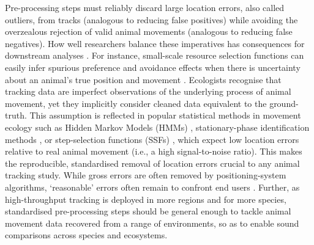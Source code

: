 \documentclass[10pt,paper=a4,headings=standardclasses
]{scrartcl}
\begin{document}
Pre-processing steps must reliably discard large location errors, also called outliers, from tracks (analogous to reducing false positives) while avoiding the overzealous rejection of valid animal movements (analogous to reducing false negatives).
How well researchers balance these imperatives has consequences for downstream analyses \citep{stine2001}.
For instance, small-scale resource selection functions can easily infer spurious preference and avoidance effects when there is uncertainty about an animal's true position and movement \citep{visscher2006}.
Ecologists recognise that tracking data are imperfect observations of the underlying process of animal movement, yet they implicitly consider cleaned data equivalent to the ground-truth.
This assumption is reflected in popular statistical methods in movement ecology such as Hidden Markov Models (HMMs) \citep{langrock2012}, stationary-phase identification methods \citep{patin2020a}, or step-selection functions (SSFs) \citep{barnett2008, signer2017, avgar2016}, which expect low location errors relative to real animal movement (i.e., a high signal-to-noise ratio).
This makes the reproducible, standardised removal of location errors crucial to any animal tracking study.
While gross errors are often removed by positioning-system algorithms, ‘reasonable’ errors often remain to confront end users \citep{fischler1981, weiser2016, ranacher2016}.
Further, as high-throughput tracking is deployed in more regions and for more species, standardised pre-processing steps should be general enough to tackle animal movement data recovered from a range of environments, so as to enable sound comparisons across species and ecosystems.
\end{document}
